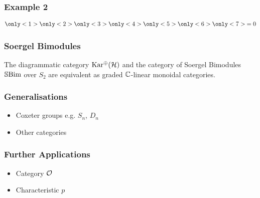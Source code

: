 \begin{frame}
    \frametitle{Example 2}

    \begin{align*}
        \only<1>{
            
        }
        \only<2>{
            
        }
        \only<3>{
            
        }
        \only<4>{
            
        }
        \only<5>{
            
        }
        \only<6>{
            
        }
        \only<7>{
             = 0
        }
    \end{align*}
\end{frame}


\begin{frame}
    \frametitle{Soergel Bimodules}

    \begin{theorem}
        The diagrammatic category $\operatorname{Kar^\oplus}(\mathcal{H})$ and the category of Soergel Bimodules $\operatorname{\mathbb{S}Bim}$ over $S_2$ are equivalent as graded $\mathbb{C}$-linear monoidal categories.
    \end{theorem}
\end{frame}


\begin{frame}
    \frametitle{Generalisations}

    \begin{itemize}
        \item Coxeter groups e.g. $S_n$, $D_n$
        \item Other categories
    \end{itemize}
\end{frame}


\begin{frame}
    \frametitle{Further Applications}

    \begin{itemize}
        \item Category $\mathcal{O}$
        \item Characteristic $p$
    \end{itemize}
\end{frame}

